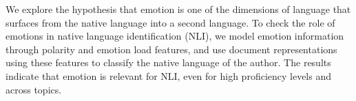 We explore the hypothesis that emotion is one of the dimensions of language that surfaces from the native language into a second language. To check the role of emotions in native language identification (NLI), we model emotion information through polarity and emotion load features, and use document representations using these features to classify the native language of the author. The results indicate that emotion is relevant for NLI, even for high proficiency levels and across topics.
